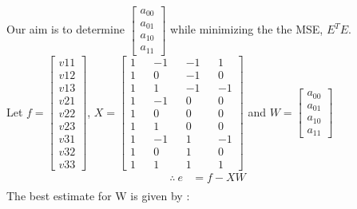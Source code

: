 \documentclass[a4paper,fleqn,11pt]{article}
\theoremstyle{mytheor}
\begin{document}
Our aim is to determine $\begin{bmatrix}
							a_{00} \\
							a_{01} \\
							a_{10} \\
							a_{11}	
						  \end{bmatrix}$ while minimizing the the MSE, $E^TE$. \\
Let $f = \begin{bmatrix}
				v{11} \\
				v{12} \\
				v{13} \\
				v{21} \\
				v{22} \\
				v{23} \\
				v{31} \\
				v{32} \\
				v{33}
			\end{bmatrix}$,
    $X = \begin{bmatrix}
				1 &&	-1 &&	-1 &&	 1 \\
				1 &&	 0 &&	-1 &&    0 \\
				1 && 	 1 &&	-1 &&	-1 \\
				1 &&	-1 &&	 0 &&	 0 \\
				1 &&	 0 &&	 0 &&	 0 \\
				1 &&	 1 &&	 0 &&	 0 \\
				1 &&	-1 &&	 1 &&	-1 \\
				1 &&	 0 &&	 1 &&	 0 \\
				1 &&	 1 &&	 1 &&	 1
			\end{bmatrix}$ and
	$W = \begin{bmatrix}
			a_{00} \\
			a_{01} \\
			a_{10} \\
			a_{11}	
		 \end{bmatrix}$
\begin{align}
\therefore\ e & = f - XW \\
\end{align}
The best estimate for W is given by : 
\end{document}
